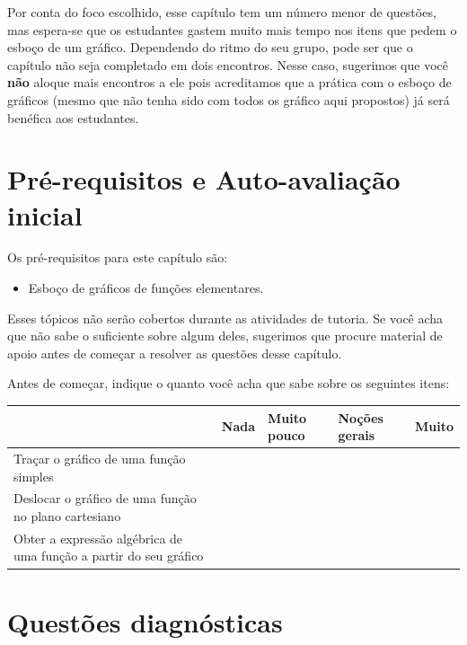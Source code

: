 \documentclass[main.tex]{subfiles}
\begin{document}
Por conta do foco escolhido, esse capítulo tem um número menor de questões, mas espera-se que os estudantes gastem muito mais tempo nos itens que pedem o esboço de um gráfico. Dependendo do ritmo do seu grupo, pode ser que o capítulo não seja completado em dois encontros. Nesse caso, sugerimos que você \textbf{não} aloque mais encontros a ele pois acreditamos que a prática com o esboço de gráficos (mesmo que não tenha sido com todos os gráfico aqui propostos) já será benéfica aos estudantes.

\paraAmbos

\section{Pré-requisitos e Auto-avaliação inicial}

Os pré-requisitos para este capítulo são:
\begin{itemize}
 \item Esboço de gráficos de funções elementares.
\end{itemize}

Esses tópicos não serão cobertos durante as atividades de tutoria. Se você acha que não sabe o suficiente sobre algum deles, sugerimos que procure material de apoio antes de começar a resolver as questões desse capítulo.

Antes de começar, indique o quanto você acha que sabe sobre os seguintes itens:

\begin{center}
 \begin{tabular}{|p{25mm}||p{10mm}|p{10mm}|p{10mm}|p{10mm}|} 
 \hline
   & Nada & Muito pouco & Noções gerais & Muito\\
 \hline
 Traçar o gráfico de uma função simples &  &  &  &  \\ 
 \hline
 Deslocar o gráfico de uma função no plano cartesiano &  &  &  &  \\
 \hline
 Obter a expressão algébrica de uma função a partir do seu gráfico &  &  &  &  \\
 \hline
\end{tabular}
\end{center}

\paraAmbos

\section{Questões diagnósticas}
\end{document}
